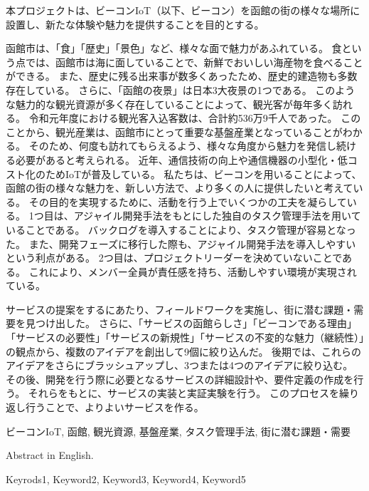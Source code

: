 \begin{jabstract} 
本プロジェクトは、ビーコンIoT（以下、ビーコン）を函館の街の様々な場所に設置し、新たな体験や魅力を提供することを目的とする。

函館市は、「食」「歴史」「景色」など、様々な面で魅力があふれている。
食という点では、函館市は海に面していることで、新鮮でおいしい海産物を食べることができる。
また、歴史に残る出来事が数多くあったため、歴史的建造物も多数存在している。
さらに、「函館の夜景」は日本3大夜景の1つである。
このような魅力的な観光資源が多く存在していることによって、観光客が毎年多く訪れる。
令和元年度における観光客入込客数は、合計約536万9千人であった。
このことから、観光産業は、函館市にとって重要な基盤産業となっていることがわかる。
そのため、何度も訪れてもらえるよう、様々な角度から魅力を発信し続ける必要があると考えられる。
近年、通信技術の向上や通信機器の小型化・低コスト化のためIoTが普及している。
私たちは、ビーコンを用いることによって、函館の街の様々な魅力を、新しい方法で、より多くの人に提供したいと考えている。
その目的を実現するために、活動を行う上でいくつかの工夫を凝らしている。
1つ目は、アジャイル開発手法をもとにした独自のタスク管理手法を用いていることである。
バックログを導入することにより、タスク管理が容易となった。
また、開発フェーズに移行した際も、アジャイル開発手法を導入しやすいという利点がある。
2つ目は、プロジェクトリーダーを決めていないことである。
これにより、メンバー全員が責任感を持ち、活動しやすい環境が実現されている。

サービスの提案をするにあたり、フィールドワークを実施し、街に潜む課題・需要を見つけ出した。
さらに、「サービスの函館らしさ」「ビーコンである理由」「サービスの必要性」「サービスの新規性」「サービスの不変的な魅力（継続性）」の観点から、複数のアイデアを創出して9個に絞り込んだ。
後期では、これらのアイデアをさらにブラッシュアップし、3つまたは4つのアイデアに絞り込む。
その後、開発を行う際に必要となるサービスの詳細設計や、要件定義の作成を行う。
それらをもとに、サービスの実装と実証実験を行う。
このプロセスを繰り返し行うことで、よりよいサービスを作る。

\begin{jkeyword}
ビーコンIoT, 函館, 観光資源, 基盤産業, タスク管理手法, 街に潜む課題・需要
\end{jkeyword}
\end{jabstract}

\begin{eabstract} Abstract in English. 
\begin{ekeyword}
Keyrods1, Keyword2, Keyword3, Keyword4, Keyword5
\end{ekeyword}
\end{eabstract}
